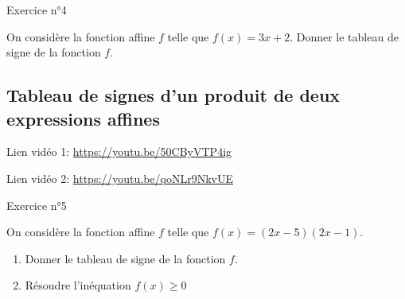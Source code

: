 \documentclass[12pt,a4paper]{article}
\begin{document}
\begin{mybox}{Exercice n°4}

On considère la fonction affine $f$ telle que $f(x)=3x+2$.
Donner le tableau de signe de la fonction $f$.

\end{mybox}
\begin{framed}
\vspace{4cm}
\end{framed}

\subsection{Tableau de signes d'un produit de deux expressions affines }



\begin{minipage}{0.85\textwidth}
Lien vidéo 1:
\url{https://youtu.be/50CByVTP4ig}
\end{minipage}
\begin{minipage}{0.2\textwidth}
\end{minipage}


\vspace{0.5cm}


\begin{minipage}{0.85\textwidth}
Lien vidéo 2:
\url{https://youtu.be/qoNLr9NkvUE}
\end{minipage}
\begin{minipage}{0.2\textwidth}
\end{minipage}


\begin{mybox}{Exercice n°5}

On considère la fonction affine $f$ telle que $f(x)=(2x-5)(2x-1)$.
\begin{enumerate}
    \item Donner le tableau de signe de la fonction $f$.
    \item Résoudre l'inéquation $f(x)\geq 0$
\end{enumerate}


\end{mybox}
\begin{framed}
\vspace{4cm}
\end{framed}
\end{document}
